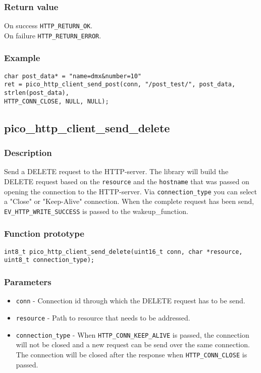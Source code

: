 \subsubsection*{Return value}
On success \texttt{HTTP\_RETURN\_OK}.
\\On failure \texttt{HTTP\_RETURN\_ERROR}.
\subsubsection*{Example}
\begin{verbatim}
char post_data* = "name=dmx&number=10"
ret = pico_http_client_send_post(conn, "/post_test/", post_data, strlen(post_data),
HTTP_CONN_CLOSE, NULL, NULL);
\end{verbatim}


\subsection{pico\_http\_client\_send\_delete}

\subsubsection*{Description}
Send a DELETE request to the HTTP-server. The library will build the DELETE request based on the \texttt{resource} and the \texttt{hostname} that was passed on opening the connection to the HTTP-server. Via \texttt{connection\_type} you can select a "Close" or "Keep-Alive" connection. When the complete request has been send, \texttt{EV\_HTTP\_WRITE\_SUCCESS} is passed to the wakeup\_function.

\subsubsection*{Function prototype}
\texttt{int8\_t pico\_http\_client\_send\_delete(uint16\_t conn, char *resource, uint8\_t connection\_type);}

\subsubsection*{Parameters}
\begin{itemize}[noitemsep]
\item \texttt{conn} - Connection id through which the DELETE request has to be send.
\item \texttt{resource} - Path to resource that needs to be addressed.
\item \texttt{connection\_type} - When \texttt{HTTP\_CONN\_KEEP\_ALIVE} is passed, the connection will not be closed and a new request can be send over the same connection. The connection will be closed after the response when \texttt{HTTP\_CONN\_CLOSE} is passed.
\end{itemize}
